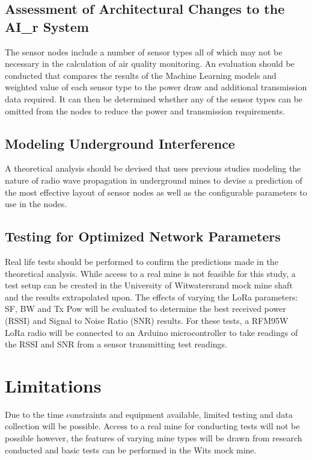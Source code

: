 \documentclass[a4paper,twoside,12pt]{report}
\begin{document}
\subsection{Assessment of Architectural Changes to the AI\_r System}
The sensor nodes include a number of sensor types all of which may not be necessary in the calculation of air quality monitoring. An evaluation should be conducted that compares the results of the Machine Learning models and weighted value of each sensor type to the power draw and additional transmission data required. It can then be determined whether any of the sensor types can be omitted from the nodes to reduce the power and transmission requirements.

\subsection{Modeling Underground Interference}
A theoretical analysis should be devised that uses previous studies modeling the nature of radio wave propagation in underground mines to devise a prediction of the most effective layout of sensor nodes as well as the configurable parameters to use in the nodes.

\subsection{Testing for Optimized Network Parameters}
Real life tests should be performed to confirm the predictions made in the theoretical analysis. While access to a real mine is not feasible for this study, a test setup can be created in the University of Witwatersrand mock mine shaft and the results extrapolated upon. The effects of varying the LoRa parameters: SF, BW and Tx Pow will be evaluated to determine the best received power (RSSI) and Signal to Noise Ratio (SNR) results.
\newline
For these tests, a RFM95W LoRa radio will be connected to an Arduino microcontroller to take readings of the RSSI and SNR from a sensor transmitting test readings.


\section{Limitations}
Due to the time constraints and equipment available, limited testing and data collection will be possible.
Access to a real mine for conducting tests will not be possible however, the features of varying mine types will be drawn from research conducted and basic tests can be performed in the Wits mock mine.
\end{document}
